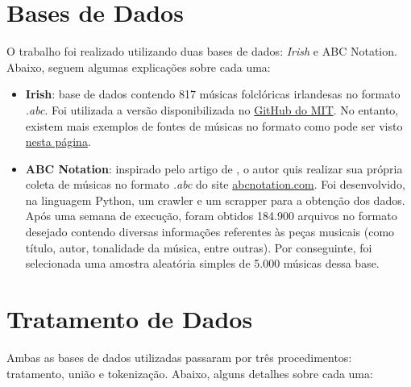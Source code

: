 \documentclass{automatextcc}
\begin{document}
\section{Bases de Dados}


O trabalho foi realizado utilizando duas bases de dados: \textit{Irish} e {ABC Notation}. Abaixo, seguem algumas explicações sobre cada uma:

\begin{itemize}
    \item \textbf{Irish}: base de dados contendo 817 músicas folclóricas irlandesas no formato \textit{.abc}. Foi utilizada a versão disponibilizada no \href{https://github.com/aamini/introtodeeplearning/blob/master/mitdeeplearning/data/irish.abc}{GitHub do MIT}. No entanto, existem mais exemplos de fontes de músicas no formato como pode ser visto \href{https://www.norbeck.nu/abc/links.asp}{nesta página}. 
    \item \textbf{ABC Notation}: inspirado pelo artigo de \citet{agarwala2017}, o autor quis realizar sua própria coleta de músicas no formato \textit{.abc} do site \href{https://abcnotation.com/}{abcnotation.com}. Foi desenvolvido, na linguagem Python, um crawler e um scrapper para a obtenção dos dados. Após uma semana de execução, foram obtidos 184.900 arquivos no formato desejado contendo diversas informações referentes às peças musicais (como título, autor, tonalidade da música, entre outras). Por conseguinte, foi selecionada uma amostra aleatória simples de 5.000 músicas dessa base.
\end{itemize}




\section{Tratamento de Dados}



Ambas as bases de dados utilizadas passaram por três procedimentos: tratamento, união e tokenização. Abaixo, alguns detalhes sobre cada uma:
\end{document}
